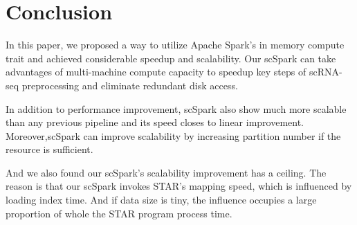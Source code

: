\documentclass[10pt,journal,compsoc]{IEEEtran}
\begin{document}




\section{Conclusion}
In this paper, we proposed a way to utilize Apache Spark's in memory compute trait and achieved considerable speedup and scalability. 
Our scSpark can take advantages of multi-machine compute capacity to speedup key steps of scRNA-seq preprocessing and eliminate redundant disk access. 

In addition to performance improvement, scSpark also show much more scalable than any previous pipeline and its speed closes to linear improvement.
Moreover,scSpark can improve scalability by increasing partition number if the resource is sufficient.

And we also found our scSpark's scalability improvement has a ceiling. 
The reason is that our scSpark invokes STAR's mapping speed, which is influenced by loading index time. 
And if data size is tiny, the influence occupies a large proportion of whole the STAR program process time. 

%
\end{document}
